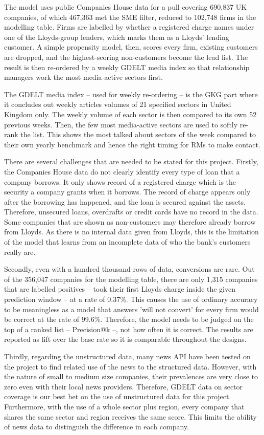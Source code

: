 \documentclass[ %
                    author={Natchalin Iwsakul \\[0.4em] Inkaphol Siriwongwattana \\[0.4em] Tanaphan Kummaraphat \\[0.6em] Patorn Srisupap},,
                supervisor={Fernando Moreno-Pino},
                    degree={MSc},
                     title={Propensity Modelling for SME Commercial Lending Using Open Public Data
},
                  subtitle={Companies House and GDELT as predictors of first-time borrowing},
                      type={},
                      year={2026}]{dissertation}
\begin{document}
The model uses public Companies House data for a pull covering 690,837 UK companies, of which 467,363 met the SME filter, reduced to 102,748 firms in the modelling table. Firms are labelled by whether a registered charge names under one of the Lloyds-group lenders, which marks them as a Lloyds' lending customer. A simple propensity model, then, scores every firm, existing customers are dropped, and the highest-scoring non-customers become the lead list. The result is then re-ordered by a weekly GDELT media index so that relationship managers work the most media-active sectors first.

The GDELT media index -- used for weekly re-ordering -- is the GKG part where it concludes out weekly articles volumes of 21 specified sectors in United Kingdom only. The weekly volume of each sector is then compared to its own 52 previous weeks. Then, the few most media-active sectors are used to softly re-rank the list. This shows the most talked about sectors of the week compared to their own yearly benchmark and hence the right timing for RMs to make contact.

There are several challenges that are needed to be stated for this project. Firstly, the Companies House data do not clearly identify every type of loan that a company borrows. It only shows record of a registered charge which is the security a company grants when it borrows. The record of charge appears only after the borrowing has happened, and the loan is secured against the assets. Therefore, unsecured loans, overdrafts or credit cards have no record in the data. Some companies that are shown as non-customers may therefore already borrow from Lloyds. As there is no internal data given from Lloyds, this is the limitation of the model that learns from an incomplete data of who the bank's customers really are.

Secondly, even with a hundred thousand rows of data, conversions are rare. Out of the 356,047 companies for the modelling table, there are only 1,315 companies that are labelled positives -- took their first Lloyds charge inside the given prediction window -- at a rate of 0.37\%. This causes the use of ordinary accuracy to be meaningless as a model that answers 'will not convert' for every firm would be correct at the rate of 99.6\%. Therefore, the model needs to be judged on the top of a ranked list -- Precision@k --, not how often it is correct. The results are reported as lift over the base rate so it is comparable throughout the designs.

Thirdly, regarding the unstructured data, many news API have been tested on the project to find related use of the news to the structured data. However, with the nature of small to medium size companies, their prevalences are very close to zero even with their local news providers. Therefore, GDELT data on sector coverage is our best bet on the use of unstructured data for this project. Furthermore, with the use of a whole sector plus region, every company that shares the same sector and region receives the same score. This limits the ability of news data to distinguish the difference in each company.
\end{document}
